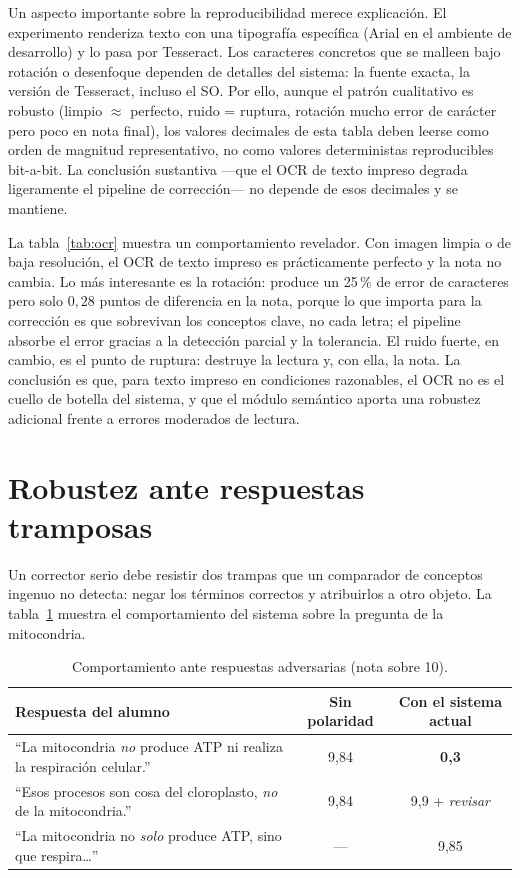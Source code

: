 Un aspecto importante sobre la reproducibilidad merece explicación. El experimento renderiza texto con una tipografía específica (Arial en el ambiente de desarrollo) y lo pasa por Tesseract. Los caracteres concretos que se malleen bajo rotación o desenfoque dependen de detalles del sistema: la fuente exacta, la versión de Tesseract, incluso el SO. Por ello, aunque el patrón cualitativo es robusto (limpio $\approx$ perfecto, ruido = ruptura, rotación mucho error de carácter pero poco en nota final), los valores decimales de esta tabla deben leerse como orden de magnitud representativo, no como valores deterministas reproducibles bit-a-bit. La conclusión sustantiva —que el OCR de texto impreso degrada ligeramente el pipeline de corrección— no depende de esos decimales y se mantiene.

La tabla~\ref{tab:ocr} muestra un comportamiento revelador. Con imagen limpia o de baja resolución, el OCR de texto impreso es prácticamente perfecto y la nota no cambia. Lo más interesante es la rotación: produce un 25\,\% de error de caracteres pero solo $0{,}28$ puntos de diferencia en la nota, porque lo que importa para la corrección es que sobrevivan los conceptos clave, no cada letra; el pipeline absorbe el error gracias a la detección parcial y la tolerancia. El ruido fuerte, en cambio, es el punto de ruptura: destruye la lectura y, con ella, la nota. La conclusión es que, para texto impreso en condiciones razonables, el OCR no es el cuello de botella del sistema, y que el módulo semántico aporta una robustez adicional frente a errores moderados de lectura.

\section{Robustez ante respuestas tramposas}

Un corrector serio debe resistir dos trampas que un comparador de conceptos ingenuo no detecta: negar los términos correctos y atribuirlos a otro objeto. La tabla~\ref{tab:robustez} muestra el comportamiento del sistema sobre la pregunta de la mitocondria.

\begin{table}[ht]
\centering
\caption{Comportamiento ante respuestas adversarias (nota sobre 10).}
\label{tab:robustez}
\small
\begin{tabularx}{\textwidth}{>{\raggedright\arraybackslash}X c c}
\toprule
Respuesta del alumno & Sin polaridad & Con el sistema actual \\
\midrule
``La mitocondria \emph{no} produce ATP ni realiza la respiración celular.'' & 9{,}84 & \textbf{0{,}3} \\
``Esos procesos son cosa del cloroplasto, \emph{no} de la mitocondria.'' & 9{,}84 & 9{,}9 + \emph{revisar} \\
``La mitocondria no \emph{solo} produce ATP, sino que respira\dots'' & --- & 9{,}85 \\
\bottomrule
\end{tabularx}
\end{table}

